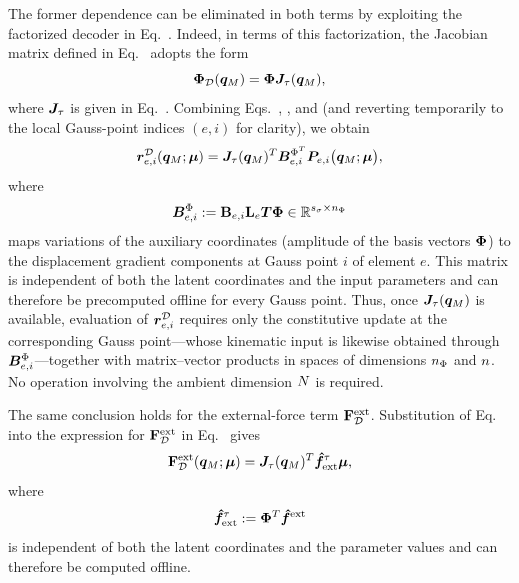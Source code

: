 \documentclass[preprint,10pt]{elsarticle}  %
\begin{document}
  The former dependence can be eliminated in both terms by
exploiting the factorized decoder in
Eq.~. Indeed,  in terms of this factorization, the
Jacobian matrix defined in Eq.~ adopts the form
\begin{equation}
\label{eq:PhiD_tau_generic}
\PhiD(\qM)
=
\PhiROM\JTAU(\qM),
\end{equation}
where  $\JTAU$ is given in Eq.~.
Combining Eqs.~,
, and  (and reverting
temporarily to the local Gauss-point indices \((e,i)\) for clarity), we obtain
\begin{equation}
\label{eq:rDec_reduced_operator}
\rDec{e,i}(\qM;\muvec)
=
\JTAU(\qM)^T
\BredT[e,i]
\PKone_{e,i}\bigl(\qM;\muvec\bigr),
\end{equation}
where
\begin{equation}
\label{eq:Bred_definition}
\Bred[e,i]
:=
\Bmat_{e,i}\Le\Tlift\PhiROM
\in\mathbb{R}^{\nstress\times\rROM}
\end{equation}
 maps variations of the auxiliary
coordinates (amplitude  of the basis vectors $\PhiROM$) to the  displacement gradient components at Gauss point
\(i\) of element \(e\). This matrix is independent of both the latent
coordinates and the input parameters and can therefore be precomputed
offline for every Gauss point. Thus, once \(\JTAU(\qM)\) is available,
evaluation of \(\rDec{e,i}\) requires only the constitutive update at
the corresponding Gauss point---whose kinematic input is likewise
obtained through \(\Bred[e,i]\)---together with matrix--vector products
in spaces of dimensions \(\rROM\) and \(\rD\). No operation involving
the ambient dimension \(\nL\) is required.

The same conclusion holds for the external-force
term \(\FextD\).  Substitution of Eq.~ into the expression for
\(\FextD\) in
Eq.~ gives
\begin{equation}
\label{eq:FextD}
\FextD(\qM;\muvec)
=
\JTAU(\qM)^T\FextONEtau\muvec,
\end{equation}
where
\begin{equation}
\label{eq:FextONEtau}
\FextONEtau
:=
\PhiROM^T\FextONE
\end{equation}
is independent of both the latent coordinates and the parameter values
and can therefore be computed offline.
\end{document}
